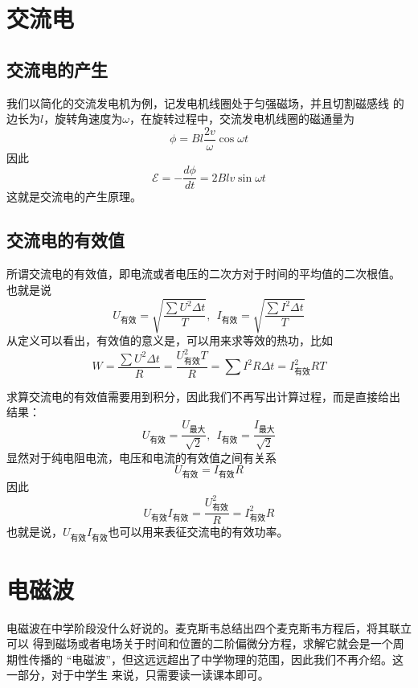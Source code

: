 \section{交流电}
\subsection{交流电的产生}
我们以简化的交流发电机为例，记发电机线圈处于匀强磁场，并且切割磁感线
的边长为$l$，旋转角速度为$\omega$，在旋转过程中，交流发电机线圈的磁通量为
\begin{equation}
    \phi=Bl\frac{2v}{\omega }\cos\omega t
\end{equation}
因此 
\begin{equation}
    \mathcal{E}=-\frac{d\phi}{dt}=
    2Blv\sin\omega t
\end{equation}
这就是交流电的产生原理。
\subsection{交流电的有效值}
所谓交流电的有效值，即电流或者电压的二次方对于时间的平均值的二次根值。
也就是说
\begin{equation}
    U_{\text{有效}}=\sqrt{\frac{\sum U^2\Delta t}{T}},~~
    I_{\text{有效}}=\sqrt{\frac{\sum I^2\Delta t}{T}}
\end{equation}
从定义可以看出，有效值的意义是，可以用来求等效的热功，比如 
\begin{equation}
    W=\frac{\sum U^2\Delta t}{R}=\frac{U_{\text{有效}}^2T}{R}
    =\sum I^2R\Delta t=I_{\text{有效}}^2RT
\end{equation}

求算交流电的有效值需要用到积分，因此我们不再写出计算过程，而是直接给出
结果：
\begin{equation}
    U_{\text{有效}}=\frac{U_{\text{最大}}}{\sqrt{2}},~~
    I_{\text{有效}}=\frac{I_{\text{最大}}}{\sqrt{2}}
\end{equation}
显然对于纯电阻电流，电压和电流的有效值之间有关系 
\begin{equation}
    U_{\text{有效}}=I_{\text{有效}}R
\end{equation}
因此 
\begin{equation}
    U_{\text{有效}}I_{\text{有效}}=\frac{U_{\text{有效}}^2}{R}
    =I_{\text{有效}}^2R
\end{equation}
也就是说，$U_{\text{有效}}I_{\text{有效}}$也可以用来表征交流电的有效功率。
\section{电磁波}
电磁波在中学阶段没什么好说的。麦克斯韦总结出四个麦克斯韦方程后，将其联立可以
得到磁场或者电场关于时间和位置的二阶偏微分方程，求解它就会是一个周期性传播的
“电磁波”，但这远远超出了中学物理的范围，因此我们不再介绍。这一部分，对于中学生
来说，只需要读一读课本即可。